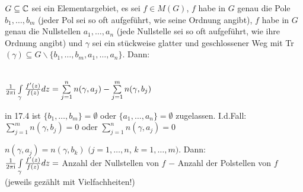 \documentclass[a4paper,twoside,DIV15,BCOR12mm]{scrbook}
\def\wegint{\ensuremath{\int\limits_\gamma}}
\def\ie{\rm i}
\begin{document}
\begin{satz} 
  $G \subseteq \mathbb{C}$ sei ein Elementargebiet, es sei $f \in M(G)$, $f$ habe in $G$ genau die
  Pole $b_1, \ldots, b_m$ (jeder Pol sei so oft aufgef\"uhrt, wie seine Ordnung
  angibt), $f$ habe in $G$ genau die Nullstellen $a_1, \ldots , a_n$ (jede
  Nullstelle sei so oft aufgef\"uhrt, wie ihre Ordnung angibt) und $\gamma$ sei ein
  st\"uckweise glatter und geschlossener Weg mit Tr$(\gamma) \subseteq G \backslash
  \{b_1, \ldots, b_m, a_1, \ldots, a_n\}$. Dann: \\ \\
  \centerline{$\frac{1}{2 \pi \ie} \wegint \frac{f'(z)}{f(z)} dz =
  \sum\limits_{j=1}^{n} n(\gamma, a_j) - \sum\limits_{j=1}^{m} n(\gamma, b_j)$}
\end{satz}

\begin{bemerkung}
  \begin{liste}
    \item in 17.4 ist $\{b_1,\ldots, b_m\} = \emptyset$ oder $\{a_1,\ldots, a_n\} =
    \emptyset$ zugelassen. I.d.Fall: $ \sum\limits_{j=1}^{m} n(\gamma, b_j) = 0$ oder
    $\sum\limits_{j=1}^{n} n(\gamma, a_j) = 0$
    \item $n(\gamma, a_j) =  n(\gamma, b_k)$ $(j=1,\dots,n$, $k = 1,\dots,m)$. Dann: \\
    $\frac{1}{2 \pi \ie} \wegint \frac{f'(z)}{f(z)} dz = $ Anzahl der Nullstellen
    von $f$ $-$ Anzahl der Polstellen von $f$ (jeweils gez\"ahlt mit Vielfachheiten!)
  \end{liste}
\end{bemerkung}
\end{document}
